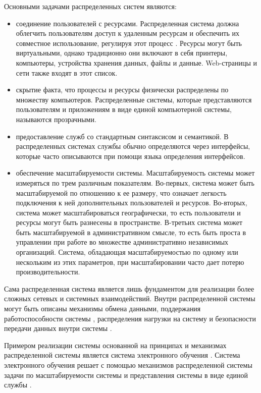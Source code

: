 Основными задачами распределенных систем являются:

\begin{itemize}
\item соединение пользователей с ресурсами. Распределенная система должна облегчить пользователям доступ к удаленным ресурсам и обеспечить их совместное использование, регулируя этот процесс \cite{ghosh2014distributed}. Ресурсы могут быть виртуальными, однако традиционно они включают в себя принтеры, компьютеры, устройства хранения данных, файлы и данные. Web-страницы и сети также входят в этот список. 
\item скрытие факта, что процессы и ресурсы физически распределены по множеству компьютеров. Распределенные системы, которые представляются пользователям и приложениям в виде единой компьютерной системы, называются прозрачными.
\item предоставление служб со стандартным синтаксисом и семантикой. В распределенных системах службы обычно определяются через интерфейсы, которые часто описываются при помощи языка определения интерфейсов.
\item обеспечение масштабируемости системы. Масштабируемость системы может измеряться по трем различным показателям. Во-первых, система может быть масштабируемой по отношению к ее размеру, что означает легкость подключения к ней дополнительных пользователей и ресурсов. Во-вторых, система может масштабироваться географически, то есть пользователи и ресурсы могут быть разнесены в пространстве. В-третьих система может быть масштабируемой в административном смысле, то есть быть проста в управлении при работе во множестве административно независимых организаций. Система, обладающая масштабируемостью по одному или нескольким из этих параметров, при масштабировании часто дает потерю производительности.
\end{itemize}

Сама распределенная система является лишь фундаментом для реализации более сложных сетевых и системных взаимодействий. Внутри распределенной системы могут быть описаны механизмы обмена данными, поддержания работоспособности системы \cite{jalote1994fault}, распределения нагрузки на систему \cite{shirazi1995scheduling} и безопасности передачи данных внутри системы \cite{chen2011parallel}. 

Примером реализации системы основанной на принципах и механизмах распределенной системы является система электронного обучения \cite{masud2012learning}. Система электронного обучения решает с помощью механизмов распределенной системы задачи по масштабируемости системы и представления системы в виде единой службы \cite{masud2012novel}. 


